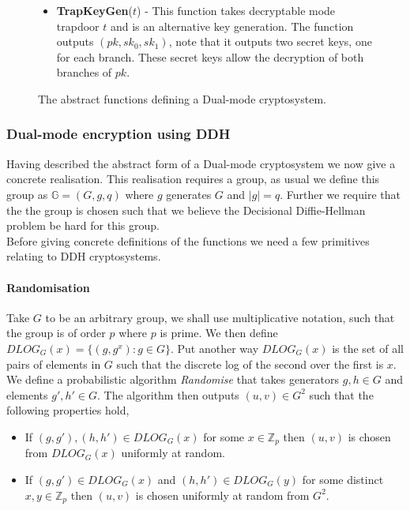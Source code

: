\documentclass[ %
                    author={Nicholas Tutte},
                supervisor={Prof. Nigel Smart},
                    degree={MEng},
                     title={Secure Two Party Computation},
                  subtitle={A practical comparison of recent protocols},
                      type={Research - GG1K},
                      year={2015} ]{dissertation}
\begin{document}
\begin{figure}[!htb]
\begin{mdframed}
\begin{itemize}
								\item \textbf{TrapKeyGen}($t$) - This function takes decryptable mode trapdoor $t$ and is an alternative key generation. The function outputs $(pk, sk_0, sk_1)$, note that it outputs two secret keys, one for each branch. These secret keys allow the decryption of both branches of $pk$.
							\end{itemize}
						\end{mdframed}

						\caption{The abstract functions defining a Dual-mode cryptosystem. \label{fig:PVW_Abstract_Functions}}
					\end{figure}

				\subsubsection{Dual-mode encryption using DDH}

					Having described the abstract form of a Dual-mode cryptosystem we now give a concrete realisation. This realisation requires a group, as usual we define this group as $\mathbb{G} = (G, g, q)$ where $g$ generates $G$ and $|g| = q$. Further we require that the the group is chosen such that we believe the Decisional Diffie-Hellman problem be hard for this group.\\

					Before giving concrete definitions of the functions we need a few primitives relating to DDH cryptosystems.\\
					
					\paragraph{Randomisation} Take $G$ to be an arbitrary group, we shall use multiplicative notation, such that the group is of order $p$ where $p$ is prime. We then define $DLOG_G(x) = \{ (g, g^x) : g \in G\}$. Put another way $DLOG_G(x)$ is the set of all pairs of elements in $G$ such that the discrete log of the second over the first is $x$.\\
					
					We define a probabilistic algorithm \emph{Randomise} that takes generators $g,h \in G$ and elements $g', h' \in G$. The algorithm then outputs $(u, v) \in G^2$ such that the following properties hold,
					
					\begin{itemize}
						\item If $(g, g'), (h, h') \in DLOG_G(x)$ for some $x \in \mathbb{Z}_p$ then $(u, v)$ is chosen from $DLOG_G(x)$ uniformly at random.

						\item If $(g, g')\in DLOG_G(x)$ and $(h, h') \in DLOG_G(y)$ for some distinct $x, y \in \mathbb{Z}_p$ then $(u, v)$ is chosen uniformly at random from $G^2$.
					\end{itemize}
\end{document}
